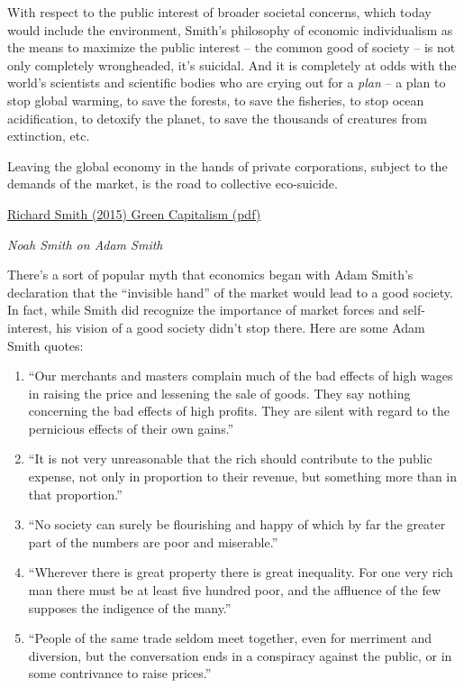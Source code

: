 \documentclass[
]{book}
\begin{document}
With respect to the public interest of broader societal concerns, which today would
include the environment, Smith's philosophy of economic individualism as the
means to maximize the public interest -- the common good of society -- is not only
completely wrongheaded, it's suicidal. And it is completely at odds with the world's
scientists and scientific bodies who are crying out for a \emph{plan} -- a plan to stop global
warming, to save the forests, to save the fisheries, to stop ocean acidification, to
detoxify the planet, to save the thousands of creatures from extinction, etc.

Leaving the global economy in the hands of private corporations,
subject to the demands of the market, is the road to collective eco-suicide.

\href{pdf/Richard_Smith_Green_Capitalism_the_God_that_Failed.pdf}{Richard Smith (2015) Green Capitalism (pdf)}

\emph{Noah Smith on Adam Smith}

There's a sort of popular myth that economics began with Adam Smith's declaration that the ``invisible hand'' of the market would lead to a good society. In fact, while Smith did recognize the importance of market forces and self-interest, his vision of a good society didn't stop there. Here are some Adam Smith quotes:

\begin{enumerate}
\def\labelenumi{\arabic{enumi}.}
\item
  ``Our merchants and masters complain much of the bad effects of high wages in raising the price and lessening the sale of goods. They say nothing concerning the bad effects of high profits. They are silent with regard to the pernicious effects of their own gains.''
\item
  ``It is not very unreasonable that the rich should contribute to the public expense, not only in proportion to their revenue, but something more than in that proportion.''
\item
  ``No society can surely be flourishing and happy of which by far the greater part of the numbers are poor and miserable.''
\item
  ``Wherever there is great property there is great inequality. For one very rich man there must be at least five hundred poor, and the affluence of the few supposes the indigence of the many.''
\item
  ``People of the same trade seldom meet together, even for merriment and diversion, but the conversation ends in a conspiracy against the public, or in some contrivance to raise prices.''
\end{enumerate}
\end{document}
